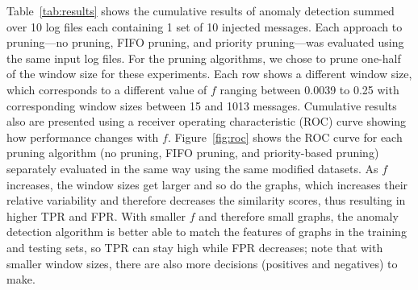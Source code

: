 Table~\ref{tab:results} shows the cumulative results of anomaly detection summed over 10 log files each containing 1 set of 10 injected messages. Each approach to pruning---no pruning, FIFO pruning, and priority pruning---was evaluated using the same input log files.  For the pruning algorithms, we chose to prune one-half of the window size for these experiments. Each row shows a different window size, which corresponds to a different value of $f$ ranging between 0.0039 to 0.25 with corresponding window sizes between 15 and 1013 messages. Cumulative results also are presented using a receiver operating characteristic (ROC) curve showing how performance changes with $f$. Figure~\ref{fig:roc} shows the ROC curve for each pruning algorithm (no pruning, FIFO pruning, and priority-based pruning) separately evaluated in the same way using the same modified datasets. As $f$ increases, the window sizes get larger and so do the graphs, which increases their relative variability and therefore decreases the similarity scores, thus resulting in higher TPR and FPR. With smaller $f$ and therefore small graphs, the anomaly detection algorithm is better able to match the features of graphs in the training and testing sets, so TPR can stay high while FPR decreases; note that with smaller window sizes, there are also more decisions (positives and negatives) to make. 

